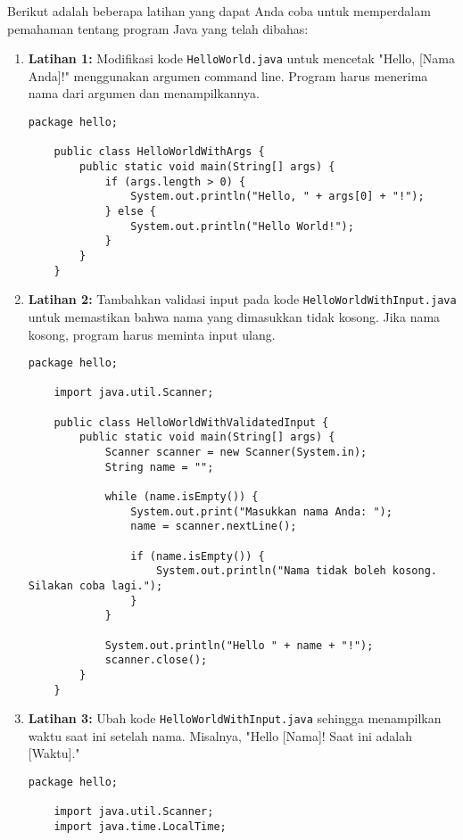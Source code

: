 Berikut adalah beberapa latihan yang dapat Anda coba untuk memperdalam pemahaman tentang program Java yang telah dibahas:

\begin{enumerate}
\item \textbf{Latihan 1:} Modifikasi kode \texttt{HelloWorld.java} untuk mencetak "Hello, [Nama Anda]!" menggunakan argumen command line. Program harus menerima nama dari argumen dan menampilkannya.

\begin{lstlisting}[style=JavaStyle, caption={Latihan 1}]
	package hello;
	
	public class HelloWorldWithArgs {
		public static void main(String[] args) {
			if (args.length > 0) {
				System.out.println("Hello, " + args[0] + "!");
			} else {
				System.out.println("Hello World!");
			}
		}
	}
\end{lstlisting}

\item \textbf{Latihan 2:} Tambahkan validasi input pada kode \texttt{HelloWorldWithInput.java} untuk memastikan bahwa nama yang dimasukkan tidak kosong. Jika nama kosong, program harus meminta input ulang.

\begin{lstlisting}[style=JavaStyle, caption={Latihan 2}]
	package hello;
	
	import java.util.Scanner;
	
	public class HelloWorldWithValidatedInput {
		public static void main(String[] args) {
			Scanner scanner = new Scanner(System.in);
			String name = "";
			
			while (name.isEmpty()) {
				System.out.print("Masukkan nama Anda: ");
				name = scanner.nextLine();
				
				if (name.isEmpty()) {
					System.out.println("Nama tidak boleh kosong. Silakan coba lagi.");
				}
			}
			
			System.out.println("Hello " + name + "!");
			scanner.close();
		}
	}
\end{lstlisting}

\item \textbf{Latihan 3:} Ubah kode \texttt{HelloWorldWithInput.java} sehingga menampilkan waktu saat ini setelah nama. Misalnya, "Hello [Nama]! Saat ini adalah [Waktu]."

\begin{lstlisting}[style=JavaStyle, caption={Latihan 3}]
	package hello;
	
	import java.util.Scanner;
	import java.time.LocalTime;
	

\end{lstlisting}
\end{enumerate}

